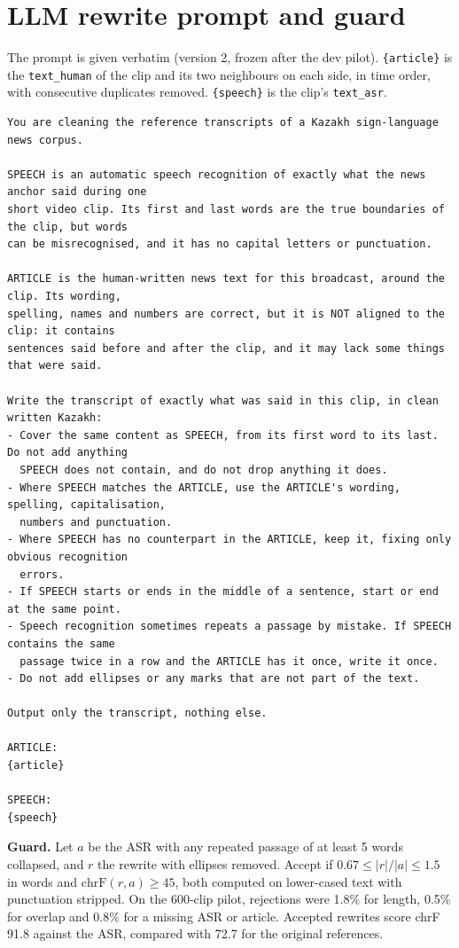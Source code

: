 \documentclass[11pt,twocolumn,a4paper]{article}
\begin{document}
\section{LLM rewrite prompt and guard}
\label{app:prompt}

The prompt is given verbatim (version 2, frozen after the dev pilot). \texttt{\{article\}} is the \texttt{text\_human} of the clip and its two neighbours on each side, in time order, with consecutive duplicates removed. \texttt{\{speech\}} is the clip's \texttt{text\_asr}.

{\small
\begin{verbatim}
You are cleaning the reference transcripts of a Kazakh sign-language news corpus.

SPEECH is an automatic speech recognition of exactly what the news anchor said during one
short video clip. Its first and last words are the true boundaries of the clip, but words
can be misrecognised, and it has no capital letters or punctuation.

ARTICLE is the human-written news text for this broadcast, around the clip. Its wording,
spelling, names and numbers are correct, but it is NOT aligned to the clip: it contains
sentences said before and after the clip, and it may lack some things that were said.

Write the transcript of exactly what was said in this clip, in clean written Kazakh:
- Cover the same content as SPEECH, from its first word to its last. Do not add anything
  SPEECH does not contain, and do not drop anything it does.
- Where SPEECH matches the ARTICLE, use the ARTICLE's wording, spelling, capitalisation,
  numbers and punctuation.
- Where SPEECH has no counterpart in the ARTICLE, keep it, fixing only obvious recognition
  errors.
- If SPEECH starts or ends in the middle of a sentence, start or end at the same point.
- Speech recognition sometimes repeats a passage by mistake. If SPEECH contains the same
  passage twice in a row and the ARTICLE has it once, write it once.
- Do not add ellipses or any marks that are not part of the text.

Output only the transcript, nothing else.

ARTICLE:
{article}

SPEECH:
{speech}
\end{verbatim}
}

\noindent\textbf{Guard.} Let $a$ be the ASR with any repeated passage of at least 5 words collapsed, and $r$ the rewrite with ellipses removed. Accept if $0.67 \le |r|/|a| \le 1.5$ in words and $\mathrm{chrF}(r, a) \ge 45$, both computed on lower-cased text with punctuation stripped. On the 600-clip pilot, rejections were 1.8\% for length, 0.5\% for overlap and 0.8\% for a missing ASR or article. Accepted rewrites score chrF 91.8 against the ASR, compared with 72.7 for the original references.
\end{document}
